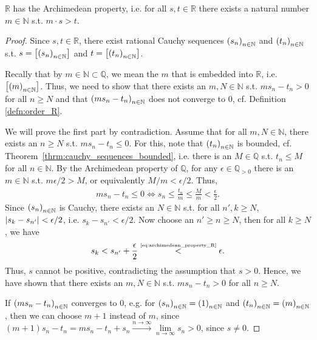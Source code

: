 \begin{theorem}
	$\mathbb R$ has the Archimedean property, i.e. for all $s, t\in\mathbb R$ there exists a natural number $m\in\mathbb N$ s.t. $m\cdot s > t$.
\end{theorem}

\begin{proof}
	Since $s, t\in\mathbb R$, there exist rational Cauchy sequences $\seq[s_n]$ and $\seq[t_n]$ s.t. $s = \left[\seq[s_n]\right]$ and $t = \left[\seq[t_n]\right]$. 
	
	Recally that by $m\in\mathbb N\subset \mathbb Q$, we mean the $m$ that is embedded into $\mathbb R$, i.e. $\left[\seq[m]\right]$. Thus, we need to show that there exists an $m, N\in\mathbb N$ s.t. $m s_n - t_n > 0$ for all $n\geq N$ and that $\seq[ms_n - t_n]$ does not converge to $0$, cf. Definition \ref{defn:order_R}.
	
	We will prove the first part by contradiction. Assume that for all $m, N\in\mathbb N$, there exists an $n\geq N$ s.t. $ms_n - t_n\leq 0$. For this, note that $\seq[t_n]$ is bounded, cf. \mbox{Theorem \ref{thrm:cauchy_sequences_bounded}}, i.e. there is an $M\in\mathbb Q$ s.t. $t_n \leq M$ for all $n\in\mathbb N$. By the Archimedean property of $\mathbb Q$, for any $\epsilon\in\mathbb Q_{> 0}$ there is an $m\in\mathbb N$ s.t. $m\epsilon/2 > M$, or equivalently $M/m < \epsilon/2$. Thus,
	\begin{align}\label{eq:archimedean_property_R}
		ms_n - t_n \leq 0 \Leftrightarrow s_n \leq \frac{t_n}{m} \leq \frac{M}{m} < \frac{\epsilon}{2}.
	\end{align}
	Since $\seq[s_n]$ is Cauchy, there exists an $N\in\mathbb N$ s.t. for all $n', k \geq N$, $\abs{s_k - s_{n'}} < \epsilon/2$, i.e. $s_k - s_{n'} < \epsilon/2$. Now choose an $n'\geq n\geq N$, then for all $k\geq N$, we have
	\begin{align*}
		s_k < s_{n'} + \frac{\epsilon}{2} \overset{\tiny\eqref{eq:archimedean_property_R}}{<} \epsilon.
	\end{align*}
	Thus, $s$ cannot be positive, contradicting the assumption that $s > 0$. Hence, we have shown that there exists an $m, N\in\mathbb N$ s.t. $m s_n - t_n > 0$ for all $n\geq N$.
	
	If $\seq[ms_n - t_n]$ converges to $0$, e.g. for $\seq[s_n] = \seq[1]$ and $\seq[t_n] = \seq[m]$, then we can choose $m + 1$ instead of $m$, since $(m + 1)s_n - t_n = ms_n - t_n + s_n \overset{n\to\infty}{\longrightarrow} \lim\limits_{n\to\infty}s_n > 0$, since $s \ne 0$.
\end{proof}

